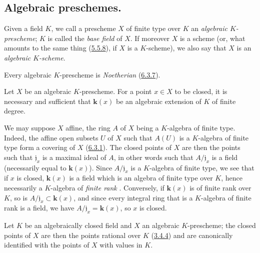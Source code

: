 \subsection{Algebraic preschemes.}
\label{subsection:I.6.4}

\begin{definition}[6.4.1]
\label{I.6.4.1}
Given a field $K$, we call a prescheme $X$ of finite type over $K$ an
\emph{algebraic $K$-prescheme}; $K$ is called the \emph{base field}
of $X$. If moreover $X$ is a scheme (or, what amounts to the same thing
(\hyperref[I.5.5.8]{5.5.8}), if $X$ is a $K$-scheme), we also say that
$X$ is an \emph{algebraic $K$-scheme}.
\end{definition}

Every algebraic $K$-prescheme is \emph{Noetherian}
(\hyperref[I.6.3.7]{6.3.7}).

\begin{proposition}[6.4.2]
\label{I.6.4.2}
Let $X$ be an algebraic $K$-prescheme. For a point $x\in X$ to be closed, it
is necessary and sufficient that $\boldsymbol{k}(x)$ be an algebraic extension of $K$ of
finite degree.
\end{proposition}

We may suppose $X$ affine, the ring $A$ of $X$ being a $K$-algebra of finite
type. Indeed, the affine open subsets $U$ of $X$ such that $A(U)$ is a
$K$-algebra of finite type form a covering of $X$
(\hyperref[I.6.3.1]{6.3.1}). The closed points of $X$ are then the points
such that $\mathfrak{j}_x$ is
a maximal ideal of $A$, in other words such that $A/\mathfrak{j}_x$ is a
field (necessarily equal to $\boldsymbol{k}(x)$). Since $A/\mathfrak{j}_x$ is a
$K$-algebra of finite type, we see that if $x$ is closed, $\boldsymbol{k}(x)$ is a field
which is an algebra of finite type over $K$, hence necessarily a $K$-algebra
of \emph{finite rank} \cite{I-21}. Conversely, if $\boldsymbol{k}(x)$ is of finite rank
over $K$, so is $A/\mathfrak{j}_x\subset \boldsymbol{k}(x)$, and since every integral ring
that is a $K$-algebra of finite rank is a field, we have
$A/\mathfrak{j}_x=\boldsymbol{k}(x)$, so $x$ is closed.

\begin{corollary}[6.4.3]
\label{I.6.4.3}
Let $K$ be an algebraically closed field and $X$ an algebraic $K$-prescheme;
the closed points of $X$ are then the points rational over $K$
\textup{(\hyperref[I.3.4.4]{3.4.4})} and are canonically identified with the points
of $X$ with values in $K$.
\end{corollary}

